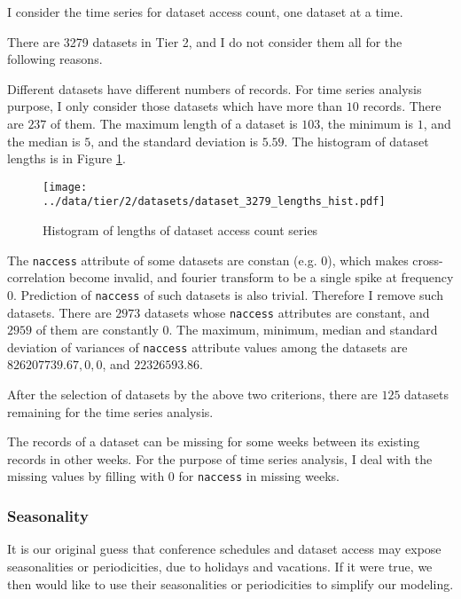 \documentclass[final, 12pt]{elsarticle}
\begin{document}
I consider the time series for dataset access count, one dataset at a time.

There are 3279 datasets in Tier 2, and I do not consider them all for the following reasons.

Different datasets have different numbers of records.
For time series analysis purpose, I only consider those datasets which have more than $10$ records. There are $237$ of them.
The maximum length of a dataset is $103$, the minimum is $1$, and the median is  $5$, and the standard deviation is $5.59$.
The histogram of dataset lengths is in Figure \ref{len}.
 
\begin{figure}
\begin{center}
\texttt{[image: ../data/tier/2/datasets/dataset\_3279\_lengths\_hist.pdf]}
\end{center}
\caption{Histogram of lengths of dataset access count series}
\label{len}
\end{figure}
   
 
The \verb|naccess| attribute of some datasets are constan (e.g. $0$), which makes cross-correlation become invalid, and fourier transform to be a single spike at frequency $0$. Prediction of \verb|naccess| of such datasets is also trivial. Therefore I remove such datasets.
There are $2973$ datasets whose \verb|naccess| attributes are constant, and $2959$ of them are constantly $0$.
The maximum, minimum, median and standard deviation of variances of \verb|naccess| attribute values among the datasets are $826207739.67, 0, 0$, and $22326593.86$.

After the selection of datasets by the above two criterions, there are $125$ datasets remaining for the time series analysis.

The records of a dataset can be missing for some weeks between its existing records in other weeks. For the purpose of time series analysis, I deal with the missing values by filling with $0$ for \verb|naccess| in missing weeks.


\subsubsection{Seasonality}

It is our original guess that conference schedules and dataset access may expose seasonalities or periodicities, due to holidays and vacations.
If it were true, we then would like to use their seasonalities or periodicities to simplify our modeling.
\end{document}
